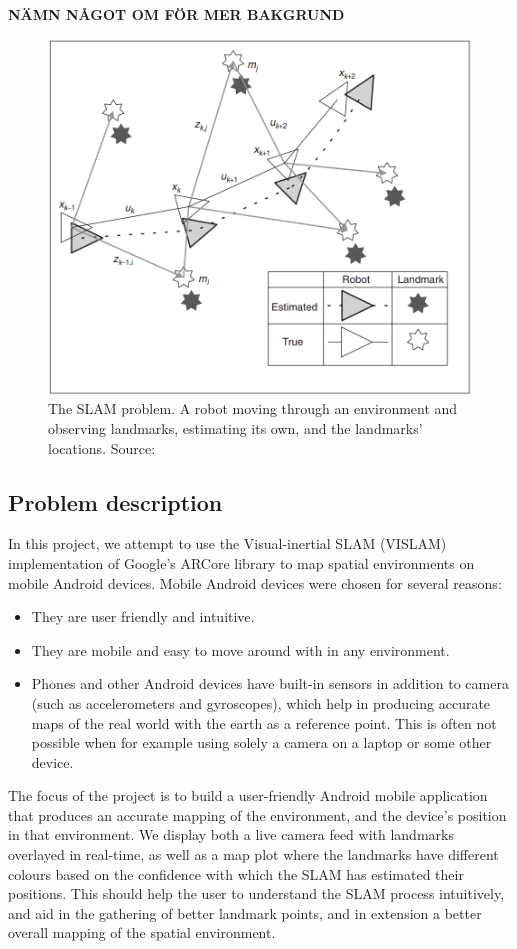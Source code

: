 \documentclass{article}
\begin{document}
\textbf{NÄMN NÅGOT OM \cite{vislam} FÖR MER BAKGRUND}

\begin{figure}[!htb]
    \centering
    \includegraphics[width=0.6\linewidth]{slam.PNG}
    \caption{The SLAM problem. A robot moving through an environment and observing landmarks, estimating its own, and the landmarks' locations. Source: \cite{background1}}
    \label{fig:slam}
\end{figure}

\subsection{Problem description}
In this project, we attempt to use the Visual-inertial SLAM (VISLAM) implementation of Google's ARCore library \cite{ARCore} to map spatial environments on mobile Android devices. Mobile Android devices were chosen for several reasons:
\begin{itemize}
    \item They are user friendly and intuitive.
    \item They are mobile and easy to move around with in any environment.
    \item Phones and other Android devices have built-in sensors in addition to camera (such as accelerometers and gyroscopes), which help in producing accurate maps of the real world with the earth as a reference point. This is often not possible when for example using solely a camera on a laptop or some other device.
\end{itemize}

The focus of the project is to build a user-friendly Android mobile application that produces an accurate mapping of the environment, and the device's position in that environment. We display both a live camera feed with landmarks overlayed in real-time, as well as a map plot where the landmarks have different colours based on the confidence with which the SLAM has estimated their positions. This should help the user to understand the SLAM process intuitively, and aid in the gathering of better landmark points, and in extension a better overall mapping of the spatial environment.
\end{document}
